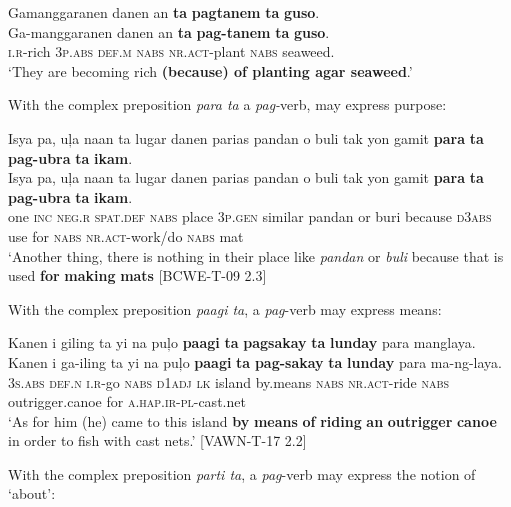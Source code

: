 \ea
Gamanggaranen  danen  an  \textbf{ta}  \textbf{pagtanem}  \textbf{ta}  \textbf{guso}. \smallskip\\
\gll Ga-manggaranen  danen  an  \textbf{ta}  \textbf{pag-tanem}  \textbf{ta}  \textbf{guso}. \\
\textsc{i.r}-rich  3\textsc{p.abs}  \textsc{def.m}  \textsc{nabs}  \textsc{nr.act}-plant  \textsc{nabs}  seaweed. \\
\glt ‘They are becoming rich \textbf{(because) of planting agar seaweed}.’
\z

With the complex preposition \textit{para ta} a \textit{pag-}verb, may express purpose:

\ea
Isya  pa,  uļa  naan  ta  lugar  danen  parias  pandan  o  buli tak  yon  gamit  \textbf{para}  \textbf{ta}  \textbf{pag-ubra}  \textbf{ta}  \textbf{ikam}. \smallskip\\
\gll Isya  pa,  uļa  naan  ta  lugar  danen  parias  pandan  o  buli tak  yon  gamit  \textbf{para}  \textbf{ta}  \textbf{pag-ubra}  \textbf{ta}  \textbf{ikam}. \\
one  \textsc{inc}  \textsc{neg.r}  \textsc{spat.def}  \textsc{nabs}  place  3\textsc{p.gen}  similar  pandan  or  buri because  \textsc{d3abs}  use  for  \textsc{nabs}  \textsc{nr.act}-work/do  \textsc{nabs}  mat \\
\glt ‘Another thing, there is nothing in their place like \textit{pandan} or \textit{buli} because that is used \textbf{for} \textbf{making} \textbf{mats} [BCWE-T-09 2.3]
\z

With the complex preposition \textit{paagi ta}, a \textit{pag}{}-verb may express means:

\ea
Kanen  i  giling  ta  yi  na  puļo  \textbf{paagi}  \textbf{ta}  \textbf{pagsakay} \textbf{ta}  \textbf{lunday}  para  manglaya. \smallskip\\
\gll Kanen  i  ga-iling  ta  yi  na  puļo  \textbf{paagi}  \textbf{ta}  \textbf{pag-sakay} \textbf{ta}  \textbf{lunday}  para  ma-ng-laya. \\
3\textsc{s.abs}  \textsc{def.n}  \textsc{i.r}-go  \textsc{nabs}  \textsc{d1adj}  \textsc{lk}  island  by.means  \textsc{nabs}  \textsc{nr.act}-ride
\textsc{nabs}  outrigger.canoe  for  \textsc{a.hap.ir}-\textsc{pl}-cast.net \\
\glt `As for him (he) came to this island \textbf{by} \textbf{means} \textbf{of} \textbf{riding} \textbf{an} \textbf{outrigger} \textbf{canoe} in order to fish with cast nets.’ [VAWN-T-17 2.2]
\z

With the complex preposition \textit{parti ta}, a \textit{pag}{}-verb may express the notion of ‘about’:

